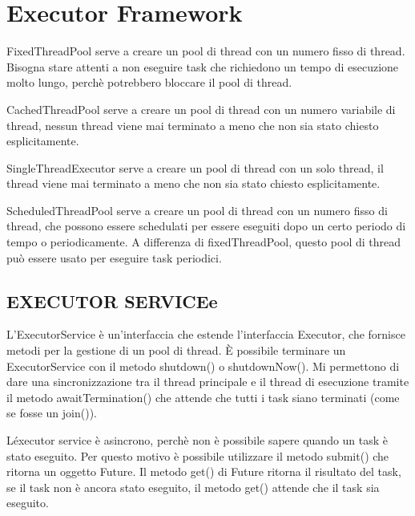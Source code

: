 \documentclass[11pt]{article}
\begin{document}
    \section{Executor Framework}\label{sec:executor-framework}

    \begin{listing}
        \item FixedThreadPool serve a creare un pool di thread con un numero fisso di thread.
        Bisogna stare attenti a non eseguire task che richiedono un tempo di esecuzione molto lungo,
        perch\`e potrebbero bloccare il pool di thread.
        \item CachedThreadPool serve a creare un pool di thread con un numero variabile di thread,
        nessun thread viene mai terminato a meno che non sia stato chiesto esplicitamente.
        \item  SingleThreadExecutor serve a creare un pool di thread con un solo thread,
        il thread viene mai terminato a meno che non sia stato chiesto esplicitamente.
        \item ScheduledThreadPool serve a creare un pool di thread con un numero fisso di thread,
        che possono essere schedulati per essere eseguiti dopo un certo periodo di tempo o periodicamente.
        A differenza di fixedThreadPool, questo pool di thread pu\`o essere usato per eseguire task periodici.
    \end{listing}

    \subsection{EXECUTOR SERVICEe}\label{subsec:callable-e-future}

    L'ExecutorService \`e un'interfaccia che estende l'interfaccia Executor,
    che fornisce metodi per la gestione di un pool di thread.
    \`E possibile terminare un ExecutorService con il metodo shutdown() o shutdownNow().
    Mi permettono di dare una sincronizzazione tra il thread principale e il thread di esecuzione tramite
    il metodo awaitTermination() che attende che tutti i task siano terminati (come se fosse un join()).

    L\'executor service \`e asincrono, perch\`e non \`e possibile sapere quando un task \`e stato eseguito.
    Per questo motivo \`e possibile utilizzare il metodo submit() che ritorna un oggetto Future.
    Il metodo get() di Future ritorna il risultato del task, se il task non \`e ancora stato eseguito,
    il metodo get() attende che il task sia eseguito.
\end{document}
